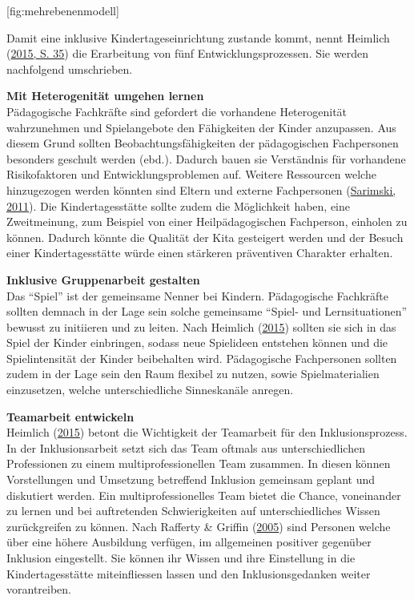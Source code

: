 \documentclass[
  ngerman,
  11pt,
  paper=a4,
  twoside,
  titlepage=true,
  openright,
  abstract=on,
  toc=listofnumbered,
  numbers=noenddot,
  chapterprefix=true,
  headings=optiontohead,
  svgnames,
  dvipsnames]{scrreprt}
\begin{document}
[fig:mehrebenenmodell]

Damit eine inklusive Kindertageseinrichtung zustande kommt, nennt
Heimlich (\protect\hyperlink{ref-inklusionQualituxe4t_Heimlich}{2015, S.
35}) die Erarbeitung von fünf Entwicklungsprozessen. Sie werden
nachfolgend umschrieben.

\textbf{Mit Heterogenität umgehen lernen}\\
Pädagogische Fachkräfte sind gefordert die vorhandene Heterogenität
wahrzunehmen und Spielangebote den Fähigkeiten der Kinder anzupassen.
Aus diesem Grund sollten Beobachtungsfähigkeiten der pädagogischen
Fachpersonen besonders geschult werden (ebd.). Dadurch bauen sie
Verständnis für vorhandene Risikofaktoren und Entwicklungsproblemen auf.
Weitere Ressourcen welche hinzugezogen werden könnten sind Eltern und
externe Fachpersonen
(\protect\hyperlink{ref-sarimskiBehinderteKinder2011}{Sarimski, 2011}).
Die Kindertagesstätte sollte zudem die Möglichkeit haben, eine
Zweitmeinung, zum Beispiel von einer Heilpädagogischen Fachperson,
einholen zu können. Dadurch könnte die Qualität der Kita gesteigert
werden und der Besuch einer Kindertagesstätte würde einen stärkeren
präventiven Charakter erhalten.

\textbf{Inklusive Gruppenarbeit gestalten}\\
Das “Spiel” ist der gemeinsame Nenner bei Kindern. Pädagogische
Fachkräfte sollten demnach in der Lage sein solche gemeinsame “Spiel-
und Lernsituationen” bewusst zu initiieren und zu leiten. Nach Heimlich
(\protect\hyperlink{ref-inklusionQualituxe4t_Heimlich}{2015}) sollten
sie sich in das Spiel der Kinder einbringen, sodass neue Spielideen
entstehen können und die Spielintensität der Kinder beibehalten wird.
Pädagogische Fachpersonen sollten zudem in der Lage sein den Raum
flexibel zu nutzen, sowie Spielmaterialien einzusetzen, welche
unterschiedliche Sinneskanäle anregen.

\textbf{Teamarbeit entwickeln}\\
Heimlich (\protect\hyperlink{ref-inklusionQualituxe4t_Heimlich}{2015})
betont die Wichtigkeit der Teamarbeit für den Inklusionsprozess. In der
Inklusionsarbeit setzt sich das Team oftmals aus unterschiedlichen
Professionen zu einem multiprofessionellen Team zusammen. In diesen
können Vorstellungen und Umsetzung betreffend Inklusion gemeinsam
geplant und diskutiert werden. Ein multiprofessionelles Team bietet die
Chance, voneinander zu lernen und bei auftretenden Schwierigkeiten auf
unterschiedliches Wissen zurückgreifen zu können. Nach Rafferty \&
Griffin (\protect\hyperlink{ref-raffertyux5cux26Griffin2005}{2005}) sind
Personen welche über eine höhere Ausbildung verfügen, im allgemeinen
positiver gegenüber Inklusion eingestellt. Sie können ihr Wissen und
ihre Einstellung in die Kindertagesstätte miteinfliessen lassen und den
Inklusionsgedanken weiter vorantreiben.
\end{document}
